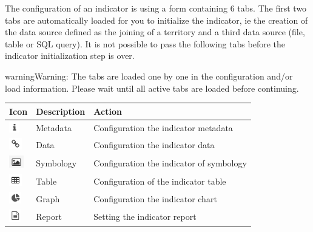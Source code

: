 \documentclass[letterpaper,10pt,english]{sphinxmanual}
\begin{document}
\begin{center}\setlength{\fboxsep}{5pt}\end{center}

The configuration of an indicator is using a form containing 6 tabs. The first two tabs are automatically loaded for you to initialize the indicator, ie the creation of the data source defined as the joining of a territory and a third data source (file, table or SQL query). It is not possible to pass the following tabs before the indicator initialization step is over.

\begin{notice}{warning}{Warning:}
The tabs are loaded one by one in the configuration and/or load information. Please wait until all active tabs are loaded before continuing.
\end{notice}

\begin{tabulary}{\linewidth}{|L|L|L|}
\hline

\textbf{Icon}
 & 
\textbf{Description}
 & 
\textbf{Action}
\\
\hline
\includegraphics{info1.png}
 & 
Metadata
 & 
Configuration the indicator metadata
\\
\hline
\includegraphics{link.png}
 & 
Data
 & 
Configuration the indicator data
\\
\hline
\includegraphics{data-raster-icon1.png}
 & 
Symbology
 & 
Configuration the indicator of symbology
\\
\hline
\includegraphics{table.png}
 & 
Table
 & 
Configuration of the indicator table
\\
\hline
\includegraphics{chart.png}
 & 
Graph
 & 
Configuration the indicator chart
\\
\hline
\includegraphics{report.png}
 & 
Report
 & 
Setting the indicator report
\\
\hline\end{tabulary}
\end{document}
